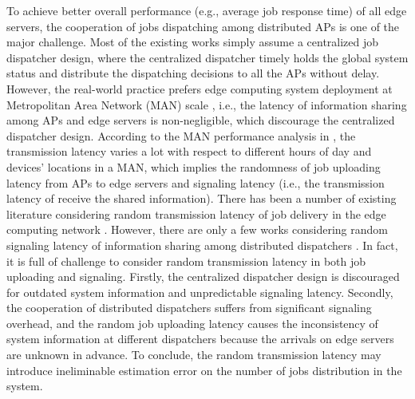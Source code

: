 To achieve better overall performance (e.g., average job response time) of all edge servers, the cooperation of jobs dispatching among distributed APs is one of the major challenge.
Most of the existing works simply assume a centralized job dispatcher design, where the centralized dispatcher timely holds the global system status and distribute the dispatching decisions to all the APs without delay.
However, the real-world practice prefers edge computing system deployment at Metropolitan Area Network (MAN) scale , i.e., the latency of information sharing among APs and edge servers is non-negligible, which discourage the centralized dispatcher design.
According to the MAN performance analysis in \cite{MAN-LATENCY}, the transmission latency varies a lot with respect to different hours of day and devices' locations in a MAN, which implies the randomness of job uploading latency from APs to edge servers and signaling latency (i.e., the transmission latency of receive the shared information).
There has been a number of existing literature considering random transmission latency of job delivery in the edge computing network \cite{latency-EDGE19,MOBIHOC19-ZhouZ,IOTJ18-FanQ,TOC19-LiuC,JSAC19-AlameddineHA}.
However, there are only a few works considering random signaling latency of information sharing among distributed dispatchers \cite{tan-online,TWC18-LyuX}.
In fact, it is full of challenge to consider random transmission latency in both job uploading and signaling.
Firstly, the centralized dispatcher design is discouraged for outdated system information and unpredictable signaling latency.
Secondly, the cooperation of distributed dispatchers suffers from significant signaling overhead, and the random job uploading latency causes the inconsistency of system information at different dispatchers because the arrivals on edge servers are unknown in advance.
To conclude, the random transmission latency may introduce ineliminable estimation error on the number of jobs {distribution} in the system.


